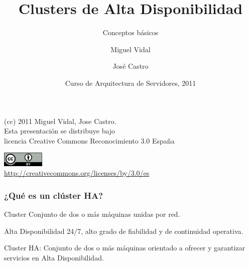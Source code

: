 \documentclass{beamer}
\begin{document}
\title{Clusters de Alta Disponibilidad}
\subtitle{Conceptos básicos}
\author{Miguel Vidal \and José Castro}
\date[CASUL 2011]{Curso de Arquitectura de Servidores, 2011}


\begin{frame}
  \vspace{2cm}
  \begin{flushright}
    {\small (cc) 2011 Miguel Vidal, Jose Castro.} \\
    \medskip
    {\scriptsize Esta presentación se distribuye bajo \\ licencia Creative Commons Reconocimiento 3.0 España}
  \end{flushright}
  \begin{center}
    \href{http://creativecommons.org/licenses/by/3.0/es}{\includegraphics[width=2cm]{format/cc-by.png}} \\
    {\tiny \url{http://creativecommons.org/licenses/by/3.0/es}}
  \end{center}
\end{frame}%


\usebackgroundtemplate{}



\begin{frame}
\frametitle{¿Qué es un clúster HA?}


\begin{block}{Cluster}
Conjunto de dos o más máquinas unidas por red.
\end{block}

\begin{block}{Alta Disponibilidad}
24/7, alto grado de fiabilidad y de continuidad operativa.
\end{block}


\begin{definition}
\alert{Cluster HA}: Conjunto de dos o más máquinas orientado a ofrecer y garantizar servicios en \alert{Alta Disponibilidad}. 
\end{definition}

\end{frame}
\end{document}
